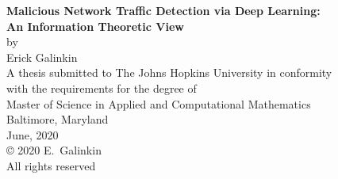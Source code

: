 \thispagestyle{empty}
\baselineskip=18pt
\begin{center}
\vspace*{3\baselineskip}
%
{\bfseries Malicious Network Traffic Detection via Deep Learning: \\An Information Theoretic View}\\[6\baselineskip]
%
by\\
%
Erick Galinkin\\[3\baselineskip]
%
%
A thesis submitted to The Johns Hopkins University in conformity\\
with the requirements for the degree of \\
Master of Science in Applied and Computational Mathematics\\[4\baselineskip]
%
Baltimore, Maryland\\
June, 2020\\[6\baselineskip]
%
{\copyright{} 2020 E.~Galinkin\\
All rights reserved}
%
\end{center}
%
\baselineskip=24pt
\newpage 
